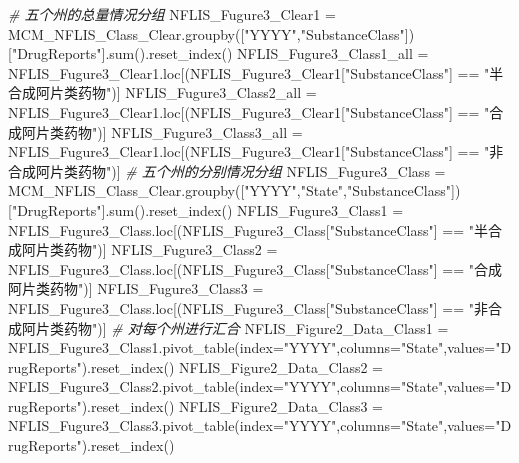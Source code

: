 \documentclass[
]{article}
\newenvironment{Shaded}{}{}
\newcommand{\BuiltInTok}[1]{#1}
\newcommand{\CommentTok}[1]{\textcolor[rgb]{0.38,0.63,0.69}{\textit{#1}}}
\newcommand{\NormalTok}[1]{#1}
\newcommand{\OperatorTok}[1]{\textcolor[rgb]{0.40,0.40,0.40}{#1}}
\newcommand{\StringTok}[1]{\textcolor[rgb]{0.25,0.44,0.63}{#1}}
\begin{document}
\begin{Shaded}
\begin{Highlighting}[]
\CommentTok{\# 五个州的总量情况分组}
\NormalTok{NFLIS\_Fugure3\_Clear1 }\OperatorTok{=}\NormalTok{ MCM\_NFLIS\_Class\_Clear.groupby([}\StringTok{"YYYY"}\NormalTok{,}\StringTok{"SubstanceClass"}\NormalTok{])[}\StringTok{"DrugReports"}\NormalTok{].}\BuiltInTok{sum}\NormalTok{().reset\_index()}
\NormalTok{NFLIS\_Fugure3\_Class1\_all }\OperatorTok{=}\NormalTok{ NFLIS\_Fugure3\_Clear1.loc[(NFLIS\_Fugure3\_Clear1[}\StringTok{"SubstanceClass"}\NormalTok{] }\OperatorTok{==} \StringTok{"半合成阿片类药物"}\NormalTok{)]}
\NormalTok{NFLIS\_Fugure3\_Class2\_all }\OperatorTok{=}\NormalTok{ NFLIS\_Fugure3\_Clear1.loc[(NFLIS\_Fugure3\_Clear1[}\StringTok{"SubstanceClass"}\NormalTok{] }\OperatorTok{==} \StringTok{"合成阿片类药物"}\NormalTok{)]}
\NormalTok{NFLIS\_Fugure3\_Class3\_all }\OperatorTok{=}\NormalTok{ NFLIS\_Fugure3\_Clear1.loc[(NFLIS\_Fugure3\_Clear1[}\StringTok{"SubstanceClass"}\NormalTok{] }\OperatorTok{==} \StringTok{"非合成阿片类药物"}\NormalTok{)]}
\CommentTok{\# 五个州的分别情况分组}
\NormalTok{NFLIS\_Fugure3\_Class }\OperatorTok{=}\NormalTok{ MCM\_NFLIS\_Class\_Clear.groupby([}\StringTok{"YYYY"}\NormalTok{,}\StringTok{"State"}\NormalTok{,}\StringTok{"SubstanceClass"}\NormalTok{])[}\StringTok{"DrugReports"}\NormalTok{].}\BuiltInTok{sum}\NormalTok{().reset\_index()}
\NormalTok{NFLIS\_Fugure3\_Class1 }\OperatorTok{=}\NormalTok{ NFLIS\_Fugure3\_Class.loc[(NFLIS\_Fugure3\_Class[}\StringTok{"SubstanceClass"}\NormalTok{] }\OperatorTok{==} \StringTok{"半合成阿片类药物"}\NormalTok{)]}
\NormalTok{NFLIS\_Fugure3\_Class2 }\OperatorTok{=}\NormalTok{ NFLIS\_Fugure3\_Class.loc[(NFLIS\_Fugure3\_Class[}\StringTok{"SubstanceClass"}\NormalTok{] }\OperatorTok{==} \StringTok{"合成阿片类药物"}\NormalTok{)]}
\NormalTok{NFLIS\_Fugure3\_Class3 }\OperatorTok{=}\NormalTok{ NFLIS\_Fugure3\_Class.loc[(NFLIS\_Fugure3\_Class[}\StringTok{"SubstanceClass"}\NormalTok{] }\OperatorTok{==} \StringTok{"非合成阿片类药物"}\NormalTok{)]}
\CommentTok{\# 对每个州进行汇合}
\NormalTok{NFLIS\_Figure2\_Data\_Class1 }\OperatorTok{=}\NormalTok{ NFLIS\_Fugure3\_Class1.pivot\_table(index}\OperatorTok{=}\StringTok{"YYYY"}\NormalTok{,columns}\OperatorTok{=}\StringTok{"State"}\NormalTok{,values}\OperatorTok{=}\StringTok{"DrugReports"}\NormalTok{).reset\_index()}
\NormalTok{NFLIS\_Figure2\_Data\_Class2 }\OperatorTok{=}\NormalTok{ NFLIS\_Fugure3\_Class2.pivot\_table(index}\OperatorTok{=}\StringTok{"YYYY"}\NormalTok{,columns}\OperatorTok{=}\StringTok{"State"}\NormalTok{,values}\OperatorTok{=}\StringTok{"DrugReports"}\NormalTok{).reset\_index()}
\NormalTok{NFLIS\_Figure2\_Data\_Class3 }\OperatorTok{=}\NormalTok{ NFLIS\_Fugure3\_Class3.pivot\_table(index}\OperatorTok{=}\StringTok{"YYYY"}\NormalTok{,columns}\OperatorTok{=}\StringTok{"State"}\NormalTok{,values}\OperatorTok{=}\StringTok{"DrugReports"}\NormalTok{).reset\_index()}
\end{Highlighting}
\end{Shaded}
\end{document}
